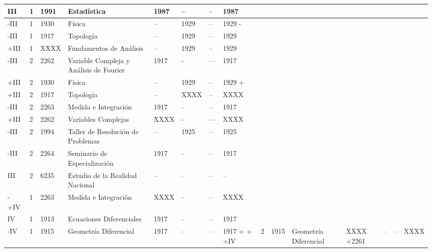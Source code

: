 \begin{description}
{\begin{center}
\begin{tabularx}{\textwidth}{|l|l|l|p{3cm}|X|X|X|X|}
 III & 1 & 1991 & Estadística &1987&--&--&1987 \\ \hline
 
-III &1 & 1930 &Física  &--&1929&--&1929 \newline
-\\ \hline
 
-III & 1 & 1917 &Topología &-- &1929&--&1929 \\ \hline
+III & 1 & XXXX &Fundamentos de Análisis &-- &1929&--&1929 \\ \hline
 
-III & 2 &2262 &Variable Compleja y \newline Análisis de Fourier &1917&-&---&1917 \\ \hline
+III &2 & 1930 &Física  &--&1929&--&1929 \newline
+\\ \hline
+III & 2 & 1917 &Topología &-- &XXXX&--&XXXX \\ \hline
 
-III & 2 &2263 &Medida e Integración &1917&--&--&1917 \\ \hline
+III & 2 &2262 &Variables Complejas  &XXXX&-&---&XXXX \\ \hline
 
-III & 2 &1994 &Taller de Resolución de Problemas  &--&1925 &--&1925 \\ \hline
 
-III & 2 & 2264 & Seminario de Especialización &1917&--&--&1917\\ \hline
 
 III & 2 & 6235 & Estudio de la Realidad Nacional &--&--&--&--\\ \hline
 
-
+IV & 1 &2263 &Medida e Integración &XXXX&--&--&XXXX \\ \hline
 
 IV & 1 & 1913 & Ecuaciones Diferenciales &1917&--&--&1917\\ \hline
 
-IV & 1 & 1915 & Geometría Diferencial & 1917 &--&--& 1917\newline
+
+
+IV & 2 & 1915 & Geometría Diferencial & XXXX\newline
+2261 &--&--& XXXX\\ \hline
 

\end{tabularx}
\end{center}}
\end{description}
